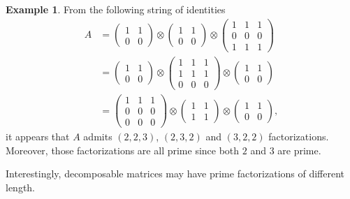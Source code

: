 \documentclass{article}
\numberwithin{equation}{section}
\theoremstyle{definition}
\newtheorem{example}[definition]{Example}
\begin{document}
\begin{example}
\label{ex: max_mat_12}
From the following string of identities
\begin{align*}
A &=
\begin{pmatrix}
1 & 1 \\
0 & 0
\end{pmatrix}
\otimes
\begin{pmatrix}
1 & 1 \\
0 & 0
\end{pmatrix}
\otimes
\begin{pmatrix}
1 & 1 & 1 \\
0 & 0 & 0 \\
1 & 1 & 1
\end{pmatrix} \\
&=
\begin{pmatrix}
1 & 1 \\
0 & 0
\end{pmatrix}
\otimes
\begin{pmatrix}
1 & 1 & 1 \\
1 & 1 & 1 \\
0 & 0 & 0
\end{pmatrix}
\otimes
\begin{pmatrix}
1 & 1 \\
0 & 0
\end{pmatrix} \\
&=
\begin{pmatrix}
1 & 1 & 1 \\
0 & 0 & 0 \\
0 & 0 & 0
\end{pmatrix}
\otimes
\begin{pmatrix}
1 & 1 \\
1 & 1
\end{pmatrix}
\otimes
\begin{pmatrix}
1 & 1 \\
0 & 0
\end{pmatrix},
\end{align*}
it appears that $A$ admits $(2,2,3)$, $(2,3,2)$ and $(3,2,2)$ factorizations. Moreover, those factorizations are all prime since both $2$ and $3$ are prime.
\end{example}

Interestingly, decomposable matrices may have prime factorizations of different length.
\end{document}
